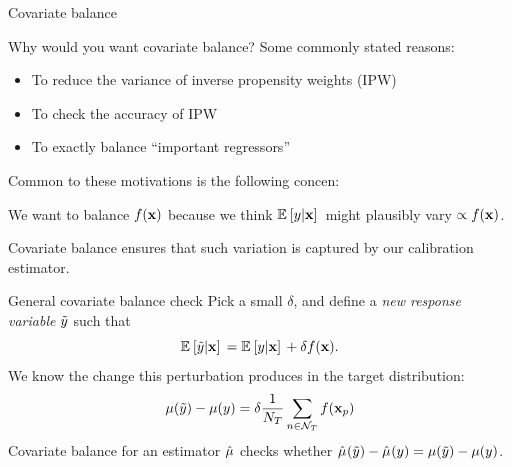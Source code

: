 \begin{frame}[t]{Covariate balance}

Why would you want covariate balance?  Some commonly stated reasons:

%
\begin{itemize}
\item To reduce the variance of inverse propensity weights (IPW)
\item To check the accuracy of IPW
\item To exactly balance ``important regressors''
\end{itemize}
%
Common to these motivations is the following concen:

    We want to balance $f(\mathbf{x})$ because we think
    $\mathbb{E}_{}\left[ y \vert \mathbf{x}\right]\,$ might plausibly vary $\propto f(\mathbf{x})$.

    Covariate balance ensures that such variation is captured
    by our calibration estimator.


\begin{block}{General covariate balance check}
    Pick a small $\delta$, and define a \emph{new response variable} $\tilde{y}$ such that
    $$
    \mathbb{E}_{}\left[ \tilde{y} \vert \mathbf{x}\right]\, = \mathbb{E}_{}\left[ y \vert \mathbf{x}\right]\, + \delta f(\mathbf{x}).
    $$
    We know the change this perturbation produces in the target distribution:
    $$
    \mu(\tilde{y}) - \mu(y) = \delta \frac{1}{N_{T}} \sum_{n \in \mathcal{N}_{T}} f(\mathbf{x}_p)
    $$
    Covariate balance for an estimator $\hat{\mu}^{}$ checks whether
    $\hat{\mu}^{}(\tilde{y}) - \hat{\mu}^{}(y) = \mu(\tilde{y}) - \mu(y)$.
\end{block}


\end{frame}





